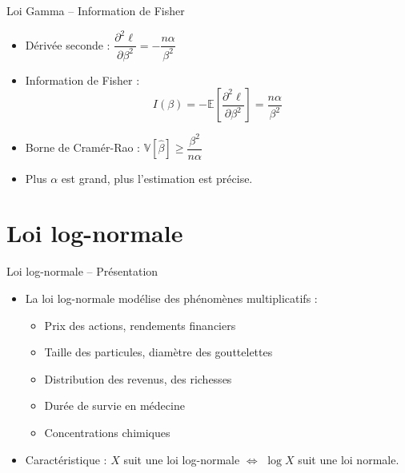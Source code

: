 \documentclass[11pt,aspectratio=169]{beamer}
\begin{document}
\begin{frame}{Loi Gamma -- Information de Fisher}

\begin{itemize}

\item Dérivée seconde : $\dfrac{\partial^2 \ell}{\partial \beta^2} = -\dfrac{n\alpha}{\beta^2}$\newline

\item Information de Fisher :
  \[
  \boxed{I(\beta) = -\mathbb{E}\left[\frac{\partial^2 \ell}{\partial \beta^2}\right] = \frac{n\alpha}{\beta^2}}
  \]

\item Borne de Cramér-Rao : $\mathbb{V}[\hat{\beta}] \geq \dfrac{\beta^2}{n\alpha}$\newline

\item Plus $\alpha$ est grand, plus l'estimation est précise.

\end{itemize}

\end{frame}

\section{Loi log-normale}

\begin{frame}{Loi log-normale -- Présentation}

\begin{itemize}

\item La loi log-normale modélise des phénomènes multiplicatifs :\newline
  \begin{itemize}
    \item Prix des actions, rendements financiers\newline
    \item Taille des particules, diamètre des gouttelettes\newline
    \item Distribution des revenus, des richesses\newline
    \item Durée de survie en médecine\newline
    \item Concentrations chimiques\newline
  \end{itemize}

\item Caractéristique : $X$ suit une loi log-normale $\Leftrightarrow$ $\log X$ suit une loi normale.

\end{itemize}

\end{frame}
\end{document}
